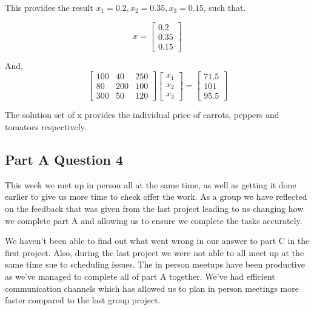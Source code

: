 \documentclass{article}
\begin{document}
This provides the result $x_1 = 0.2, x_2 = 0.35, x_3 = 0.15$, such that.

\begin{equation*}
    x =
    \begin{bmatrix}
        0.2 \\0.35 \\0.15
    \end{bmatrix}
\end{equation*}

And,
\begin{equation*}
     \begin{bmatrix}
         100 & 40 & 250 \\ 80 & 200 & 100 \\ 300 & 50 & 120
     \end{bmatrix}
     \begin{bmatrix}
         x_1 \\ x_2 \\ x_3
     \end{bmatrix}
     =
     \begin{bmatrix}
         71.5 \\ 101 \\ 95.5
     \end{bmatrix}
\end{equation*}

The solution set of x provides the individual price of carrots, peppers and tomatoes respectively.





\subsection*{Part A Question 4}
This week we met up in person all at the same time, as well as getting it done earlier to give us more time to check offer the work.
As a group we have reflected on the feedback that was given from the last project leading to us changing how we complete part A and allowing us to ensure we complete the tasks accurately.

We haven't been able to find out what went wrong in our answer to part C in the first project. Also, during the last project we were not able to all meet up at the same time sue to scheduling issues.
The in person meetups have been productive as we've managed to complete all of part A together.
We've had efficient communication channels which has allowed us to plan in person meetings more faster compared to the last group project.
\end{document}
